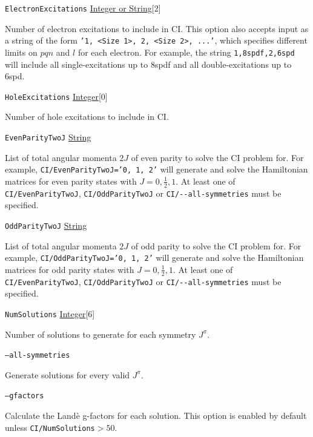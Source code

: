 \documentclass{report}
\begin{document}
\texttt{ElectronExcitations} \uline{Integer or String}[2]
\begin{adjustwidth}{1cm}{}
Number of electron excitations to include in CI. 
This option also accepts input as a string of the form \texttt{'1, <Size 1>, 2, <Size 2>, ...'},
which specifies different limits on $pqn$ and $l$ for each electron. For example, the string
\texttt{1,8spdf,2,6spd} will include all single-excitations up to 8spdf and all double-excitations up to 
6spd.
\end{adjustwidth}

\texttt{HoleExcitations} \uline{Integer}[0]
\begin{adjustwidth}{1cm}{}
Number of hole excitations to include in CI.
\end{adjustwidth}

\texttt{EvenParityTwoJ} \uline{String}
\begin{adjustwidth}{1cm}{}
List of total angular momenta $2J$ of even parity to solve the CI problem for.
For example, \texttt{CI/EvenParityTwoJ='0, 1, 2'} will generate and solve the Hamiltonian matrices for
even parity states with $J = 0, \frac{1}{2}, 1$. At least one of \texttt{CI/EvenParityTwoJ}, 
\texttt{CI/OddParityTwoJ} or \texttt{CI/{-}{-}all-symmetries} must be specified.
\end{adjustwidth}

\texttt{OddParityTwoJ} \uline{String}
\begin{adjustwidth}{1cm}{}
List of total angular momenta $2J$ of odd parity to solve the CI problem for.
For example, \texttt{CI/OddParityTwoJ='0, 1, 2'} will generate and solve the Hamiltonian matrices for
odd parity states with $J = 0, \frac{1}{2}, 1$. At least one of \texttt{CI/EvenParityTwoJ}, 
\texttt{CI/OddParityTwoJ} or \texttt{CI/{-}{-}all-symmetries} must be specified.
\end{adjustwidth}

\texttt{NumSolutions} \uline{Integer}[6] 
\begin{adjustwidth}{1cm}{}
Number of solutions to generate for each symmetry $J^{\pi}$.
\end{adjustwidth}

\texttt{--all-symmetries} 
\begin{adjustwidth}{1cm}{}
Generate solutions for every valid $J^{\pi}$.
\end{adjustwidth}

\texttt{--gfactors} 
\begin{adjustwidth}{1cm}{}
Calculate the Land\`{e} g-factors for each solution. This option is enabled by default unless 
\texttt{CI/NumSolutions}$> 50$.
\end{adjustwidth}
\end{document}
